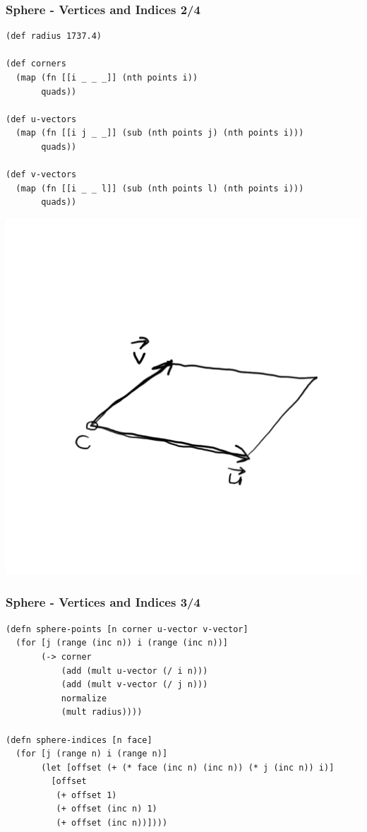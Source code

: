 \documentclass[aspectratio=169,11pt,xcolor=dvipsnames]{beamer}
\begin{document}
\begin{frame}[fragile]
  \frametitle{Sphere {-} Vertices and Indices 2/4}
  \begin{minipage}[b]{0.75\textwidth}
    \begin{verbatim}
(def radius 1737.4)

(def corners
  (map (fn [[i _ _ _]] (nth points i))
       quads))

(def u-vectors
  (map (fn [[i j _ _]] (sub (nth points j) (nth points i)))
       quads))

(def v-vectors
  (map (fn [[i _ _ l]] (sub (nth points l) (nth points i)))
       quads))
    \end{verbatim}
  \end{minipage}
  \begin{minipage}[b]{0.23\textwidth}
    \includegraphics[width=\textwidth]{cuv}
  \end{minipage}
\end{frame}

\begin{frame}[fragile]
  \frametitle{Sphere {-} Vertices and Indices 3/4}
  \begin{verbatim}
(defn sphere-points [n corner u-vector v-vector]
  (for [j (range (inc n)) i (range (inc n))]
       (-> corner
           (add (mult u-vector (/ i n)))
           (add (mult v-vector (/ j n)))
           normalize
           (mult radius))))

(defn sphere-indices [n face]
  (for [j (range n) i (range n)]
       (let [offset (+ (* face (inc n) (inc n)) (* j (inc n)) i)]
         [offset
          (+ offset 1)
          (+ offset (inc n) 1)
          (+ offset (inc n))])))
  \end{verbatim}
\end{frame}
\end{document}
